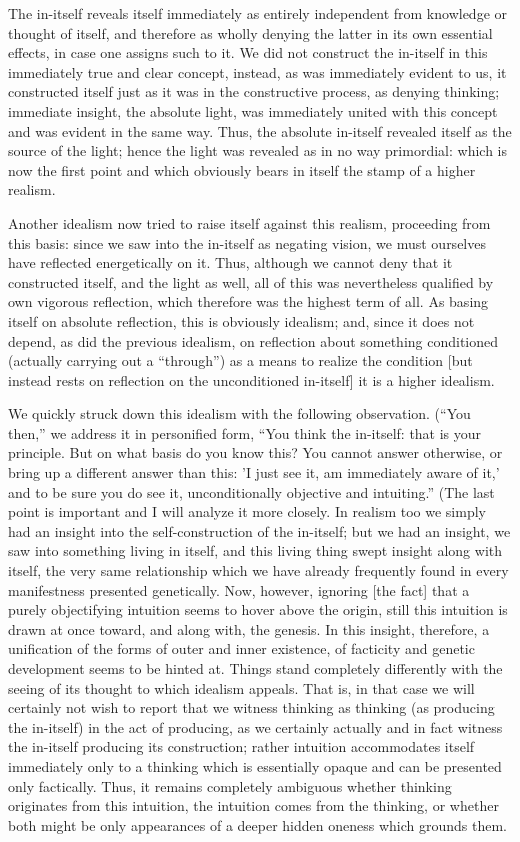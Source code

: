 The in-itself reveals itself immediately
as entirely independent from knowledge or thought of itself,
and therefore as wholly denying the latter
in its own essential effects, in case one assigns such to it.
We did not construct the in-itself
in this immediately true and clear concept,
instead, as was immediately evident to us,
it constructed itself just as it was
in the constructive process, as denying thinking;
immediate insight, the absolute light, was
immediately united with this concept
and was evident in the same way.
Thus, the absolute in-itself revealed itself
as the source of the light;
hence the light was revealed
as in no way primordial:
which is now the first point
and which obviously bears in itself
the stamp of a higher realism.

Another idealism now tried to raise itself
against this realism, proceeding from this basis:
since we saw into the in-itself as negating vision,
we must ourselves have reflected energetically on it.
Thus, although we cannot deny that it constructed itself,
and the light as well, all of this was nevertheless
qualified by own vigorous reflection,
which therefore was the highest term of all.
As basing itself on absolute reflection,
this is obviously idealism;
and, since it does not depend,
as did the previous idealism,
on reflection about something conditioned
(actually carrying out a “through”)
as a means to realize the condition
[but instead rests on reflection
on the unconditioned in-itself]
it is a higher idealism.

We quickly struck down this idealism
with the following observation.
(“You then,” we address it in personified form,
“You think the in-itself: that is your principle.
But on what basis do you know this?
You cannot answer otherwise,
or bring up a different answer than this:
'I just see it, am immediately aware of it,'
and to be sure you do see it,
unconditionally objective and intuiting.”
(The last point is important and I will analyze it more closely.
In realism too we simply had an insight
into the self-construction of the in-itself;
but we had an insight, we saw into something living in itself,
and this living thing swept insight along with itself,
the very same relationship which we have already frequently found
in every manifestness presented genetically.
Now, however, ignoring [the fact] that
a purely objectifying intuition seems
to hover above the origin,
still this intuition is drawn at once toward,
and along with, the genesis.
In this insight, therefore,
a unification of the forms
of outer and inner existence,
of facticity and genetic development
seems to be hinted at.
Things stand completely differently with the seeing of
its thought to which idealism appeals.
That is, in that case we will certainly
not wish to report that we witness thinking as thinking
(as producing the in-itself)
in the act of producing, 
as we certainly actually and in fact witness
the in-itself producing its construction;
rather intuition accommodates itself immediately only to
a thinking which is essentially opaque
and can be presented only factically.
Thus, it remains completely ambiguous
whether thinking originates from this intuition,
the intuition comes from the thinking,
or whether both might be only appearances
of a deeper hidden oneness which grounds them.

